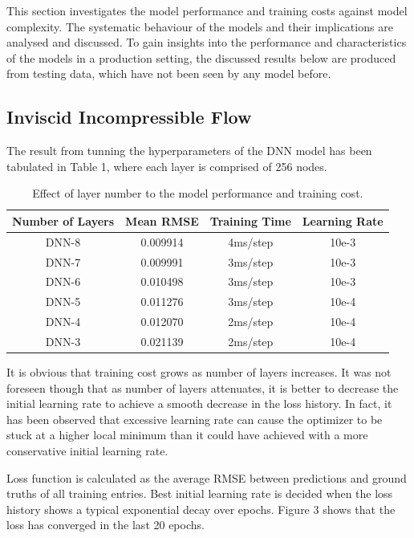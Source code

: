 \documentclass[11pt]{article}
\begin{document}
This section investigates the model performance and training costs against model complexity. The systematic behaviour of the models and their implications are analysed and discussed. To gain insights into the performance and characteristics of the models in a production setting, the discussed results below are produced from testing data, which have not been seen by any model before.

\subsection{Inviscid Incompressible Flow}

The result from tunning the hyperparameters of the DNN model has been tabulated in Table 1, where each layer is comprised of 256 nodes.

\begin{table}[H]
	\centering
	\caption{Effect of layer number to the model performance and training cost.}
	\label{tab:Example}
	\begin{tabular}{cccc}
		\hline
		Number of Layers & Mean RMSE & Training Time & Learning Rate \\ \hline
		DNN-8     & 0.009914 & 4ms/step & 10e-3       \\
		DNN-7     & 0.009991 & 3ms/step & 10e-3       \\
		DNN-6     & 0.010498 & 3ms/step & 10e-3       \\
		DNN-5     & 0.011276 & 3ms/step & 10e-4       \\
		DNN-4     & 0.012070 & 2ms/step & 10e-4       \\
		DNN-3     & 0.021139 & 2ms/step & 10e-4       \\ \hline
	\end{tabular}
\end{table}

It is obvious that training cost grows as number of layers increases. It was not foreseen though that as number of layers attenuates, it is better to decrease the initial learning rate to achieve a smooth decrease in the loss history. In fact, it has been observed that excessive learning rate can cause the optimizer to be stuck at a higher local minimum than it could have achieved with a more conservative initial learning rate.

Loss function is calculated as the average RMSE between predictions and ground truths of all training entries. Best initial learning rate is decided when the loss history shows a typical exponential decay over epochs. Figure 3 shows that the loss has converged in the last 20 epochs.
\end{document}
